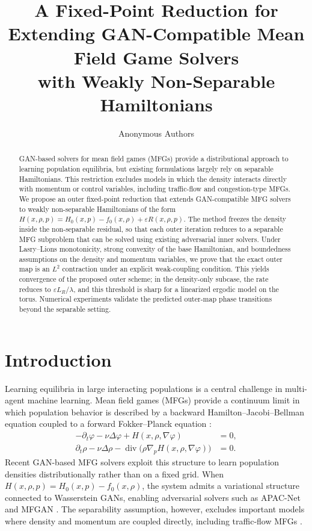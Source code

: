 \documentclass{article}
\title{A Fixed-Point Reduction for Extending GAN-Compatible Mean Field Game Solvers\\
with Weakly Non-Separable Hamiltonians}
\author{Anonymous Authors}
\newcommand{\eps}{\varepsilon}
\newcommand{\Div}{\operatorname{div}}
\begin{document}
\maketitle

\begin{abstract}
GAN-based solvers for mean field games (MFGs) provide a distributional approach
to learning population equilibria, but existing formulations largely rely on
separable Hamiltonians.  This restriction excludes models in which the density
interacts directly with momentum or control variables, including traffic-flow and
congestion-type MFGs.  We propose an outer fixed-point reduction that extends
GAN-compatible MFG solvers to weakly non-separable Hamiltonians of the form
\(H(x,\rho,p)=H_0(x,p)-f_0(x,\rho)+\eps R(x,\rho,p)\).  The method freezes the
density inside the non-separable residual, so that each outer iteration reduces
to a separable MFG subproblem that can be solved using existing adversarial inner
solvers.  Under Lasry--Lions monotonicity, strong convexity of the base
Hamiltonian, and boundedness assumptions on the density and momentum variables, we prove
that the exact outer map is an \(L^2\) contraction under an explicit
weak-coupling condition.  This yields convergence of the proposed outer scheme;
in the density-only subcase, the rate reduces to \(\eps L_R/\lambda\), and this
threshold is sharp for a linearized ergodic model on the torus.  Numerical
experiments validate the predicted outer-map phase transitions beyond the
separable setting.
\end{abstract}

\section{Introduction}

Learning equilibria in large interacting populations is a central challenge in
multi-agent machine learning.  Mean field games (MFGs) provide a continuum
limit in which population behavior is described by a backward
Hamilton--Jacobi--Bellman equation coupled to a forward Fokker--Planck equation
\citep{lasry2007mean,huang2006large}:
\begin{align}
  -\partial_t \varphi-\nu\Delta\varphi+H(x,\rho,\nabla\varphi)&=0,
  \label{eq:hjb}\\
  \partial_t\rho-\nu\Delta\rho-\Div\!\bigl(\rho\nabla_pH(x,\rho,\nabla\varphi)\bigr)&=0.
  \label{eq:fp}
\end{align}
Recent GAN-based MFG solvers exploit this structure to learn population
densities distributionally rather than on a fixed grid.  When
\(H(x,\rho,p)=H_0(x,p)-f_0(x,\rho)\), the system admits a variational structure
connected to Wasserstein GANs, enabling adversarial solvers such as APAC-Net and
MFGAN \citep{goodfellow2014generative,arjovsky2017wasserstein,
cao2021connecting,lin2021apac,ruthotto2020machine}.  The separability
assumption, however, excludes important models where density and momentum are
coupled directly, including traffic-flow MFGs \citep{huang2019mfg}.
\end{document}

